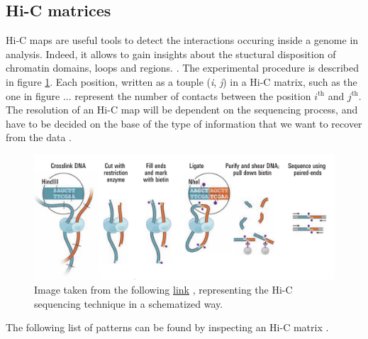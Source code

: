 \subsection{Hi-C matrices} \label{chap: Hi-C matrices}

Hi-C maps are useful tools to detect the interactions occuring inside a genome in analysis. Indeed, it allows to gain insights about the stuctural disposition of chromatin domains, loops and regions.
\cite{lajoieHitchhikerGuideHiC2015}.
The experimental procedure is described in figure \ref{fig: HiC sequencing}. Each position, written as a touple (\textit{i}, \textit{j})  in a Hi-C matrix, such as the one in figure ... %
represent the number of contacts between the position $i^{\text{th}}$ and $j^{\text{th}}$. The resolution of an Hi-C map will be dependent on the sequencing process, and have to be decided on the base of the type of information that we want to recover from the data
\cite{lajoieHitchhikerGuideHiC2015}.

\begin{figure}[H]
    \includegraphics[width=0.75\linewidth]{./images/HiC-seq.png}
    \caption{Image taken from the following \href{https://data.4dnucleome.org/experiment-types/dilution-hi-c/}{link}
    \cite{lieberman-aidenComprehensiveMappingLong2009}, 
    representing the Hi-C sequencing technique in a schematized way.}
    \label{fig: HiC sequencing}
\end{figure}

The following list of patterns can be found by inspecting an Hi-C matrix
\cite{distefanoHiCconstrainedPhysicalModels2016,lajoieHitchhikerGuideHiC2015}.

